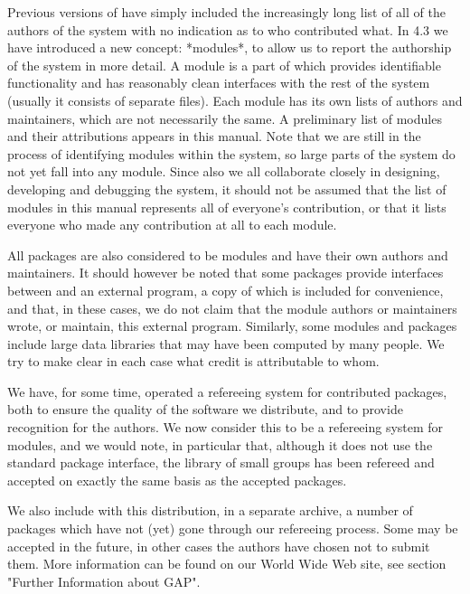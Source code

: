 
Previous versions of {\GAP} have simply included the increasingly long
list of all of the authors of the system with no indication as to who
contributed what. In {\GAP} 4.3 we have introduced a new concept:
*modules*, to allow us to report the authorship of the system in more
detail. A module is a part of {\GAP} which provides identifiable
functionality and has reasonably clean interfaces with the rest of the
system (usually it consists of separate files). Each module has its
own lists of authors and maintainers, which are not necessarily the
same. A preliminary list of modules and their attributions appears in
this manual. Note that we are still in the process of identifying
modules within the system, so large parts of the system do not yet
fall into any module. Since also we all collaborate closely in
designing, developing and debugging the system, it should not be
assumed that the list of modules in this manual represents all of
everyone's contribution, or that it lists everyone who made any
contribution at all to each module.

All {\GAP} packages are also considered to be modules and have their
own authors and maintainers. It should however be noted that some
packages provide interfaces between {\GAP} and an external program, a
copy of which is included for convenience, and that, in these cases,
we do not claim that the module authors or maintainers wrote, or
maintain, this external program. Similarly, some modules and packages
include large data libraries that may have been computed by many
people. We try to make clear in each case what credit is attributable
to whom.

We have, for some time, operated a refereeing system for contributed
packages, both to ensure the quality of the software we distribute,
and to provide recognition for the authors. We now consider this to be
a refereeing system for modules, and we would note, in particular
that, although it does not use the standard package interface, the
library of small groups has been refereed and accepted on exactly the
same basis as the accepted  packages.

We also include with this distribution, in a separate archive, a
number of packages which have not (yet) gone through our refereeing
process. Some may be accepted in the future, in other cases the
authors have chosen not to submit them.  More information can be found
on our World Wide Web site, see section "Further Information about
GAP".


